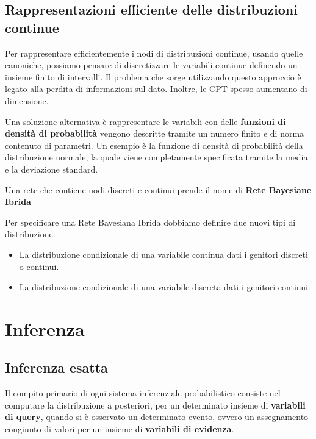 \subsection{Rappresentazioni efficiente delle distribuzioni continue}
Per rappresentare efficientemente i nodi di distribuzioni continue, usando quelle
canoniche, possiamo pensare di discretizzare le variabili continue definendo un
insieme finito di intervalli. Il problema che sorge utilizzando questo approccio
è legato alla perdita di informazioni sul dato. Inoltre, le CPT spesso aumentano
di dimensione.

Una soluzione alternativa è rappresentare le variabili con delle \textbf{funzioni
    di densità di probabilità} vengono descritte tramite un numero finito e di
norma contenuto di parametri. Un esempio è la funzione di densità di probabilità
della distribuzione normale, la quale viene completamente specificata tramite
la media e la deviazione standard.
\begin{definizione}
    Una rete che contiene nodi discreti e continui prende il nome di \textbf{Rete
        Bayesiane Ibrida}
\end{definizione}
Per specificare una Rete Bayesiana Ibrida dobbiamo definire due nuovi tipi di
distribuzione:
\begin{itemize}
    \item La distribuzione condizionale di una variabile continua dati i genitori
          discreti o continui.
    \item La distribuzione condizionale di una variabile discreta dati i genitori
          continui.
\end{itemize}
\section{Inferenza}
\subsection{Inferenza esatta}
Il compito primario di ogni sistema inferenziale probabilistico consiste nel
computare la distribuzione a posteriori, per un determinato insieme di \textbf{variabili
    di query}, quando si è osservato un determinato evento, ovvero un assegnamento
congiunto di valori per un insieme di \textbf{variabili di evidenza}.

